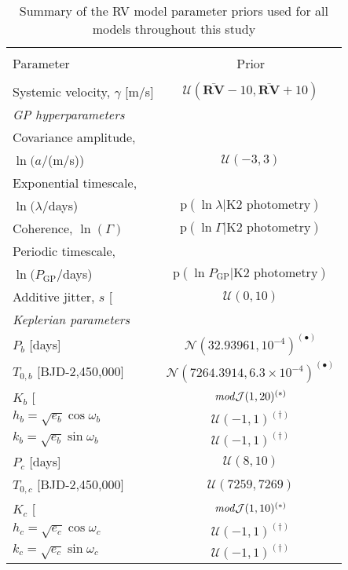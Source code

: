 \begin{table*}
\small
\renewcommand{\arraystretch}{0.7}
\centering
\caption[]{Summary of the RV model parameter priors used for all models throughout this study}
\label{k2182table:priors}
\begin{tabular}{lc}
\hline \\ [-1ex]
Parameter & Prior \smallskip \\
\hline \\ [-1ex]
Systemic velocity, $\gamma$ [m/s] & $\mathcal{U}(\bar{\mathbf{RV}}-10, \bar{\mathbf{RV}}+10)$ \smallskip \\
\emph{GP hyperparameters} & \\
Covariance amplitude, & \\
$\ln{(a/}$(m/s)) & $\mathcal{U}(-3,3)$ \\
Exponential timescale, & \\
$\ln{(\lambda/}$days) & $\text{p}(\ln{\lambda}|\text{K2 photometry})$ \\
Coherence, $\ln{(\Gamma)}$ & $\text{p}(\ln{\Gamma}|\text{K2 photometry})$ \\
Periodic timescale, & \\
$\ln{(P_{\text{GP}}/}$days) & $\text{p}(\ln{P_{\text{GP}}}|\text{K2 photometry})$  \\
Additive jitter, $s$ [\mps{]} & $\mathcal{U}(0,10)$ \smallskip \\
\emph{Keplerian parameters} & \\
$P_b$ [days] & $\mathcal{N}(32.93961,10^{-4})^{(\bullet)}$ \\
$T_{0,b}$ [BJD-2,450,000] & $\mathcal{N}(7264.3914,6.3 \times 10^{-4})^{(\bullet)}$ \\
$K_b$ [\mps{]} & $\text{\emph{mod}}\mathcal{J}(1,20)^{(\ast)}$ \\
$h_b = \sqrt{e_b}\cos{\omega_b}$ & $\mathcal{U}(-1,1)^{(\dagger)}$ \\
$k_b = \sqrt{e_b}\sin{\omega_b}$ & $\mathcal{U}(-1,1)^{(\dagger)}$ \\
$P_c$ [days] & $\mathcal{U}(8,10)$ \\
$T_{0,c}$ [BJD-2,450,000] & $\mathcal{U}(7259,7269)$ \\
$K_c$ [\mps{]} & $\text{\emph{mod}}\mathcal{J}(1,10)^{(\ast)}$ \\
$h_c = \sqrt{e_c}\cos{\omega_c}$ & $\mathcal{U}(-1,1)^{(\dagger)}$ \\
$k_c = \sqrt{e_c}\sin{\omega_c}$ & $\mathcal{U}(-1,1)^{(\dagger)}$ \medskip \\
\hline
\end{tabular}

\end{table*}
